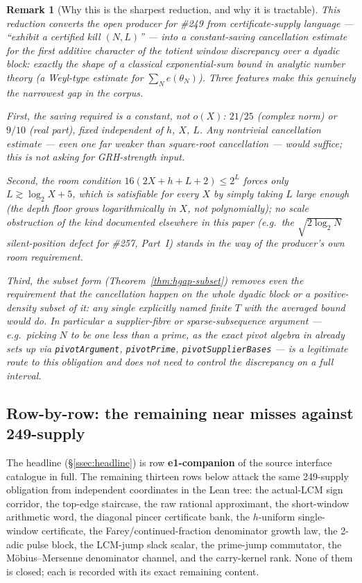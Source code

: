 \documentclass[11pt]{article}
\theoremstyle{breakplain}
\theoremstyle{breakdefinition}
\theoremstyle{breakdefinition}
\newtheorem{rem}[thm]{Remark}
\newcommand{\lean}[2]{\leanlink{#1}{#2}}
\begin{document}
\begin{rem}[Why this is the sharpest reduction, and why it is tractable]
This reduction converts the open producer for \#249 from certificate-supply language --- ``exhibit
a certified kill $(N,L)$'' --- into a \emph{constant-saving cancellation estimate for the first
additive character of the totient window discrepancy over a dyadic block}: exactly the shape of a
classical exponential-sum bound in analytic number theory (a Weyl-type estimate for
$\sum_N e(\theta_N)$). Three features make this genuinely the narrowest gap in the corpus.

First, the saving required is a \emph{constant}, not $o(X)$: $21/25$ (complex norm) or $9/10$
(real part), fixed independent of $h$, $X$, $L$. Any nontrivial cancellation estimate --- even one
far weaker than square-root cancellation --- would suffice; this is not asking for GRH-strength
input.

Second, the room condition $16(2X{+}h{+}L{+}2)\le 2^L$ forces only $L \gtrsim \log_2 X + 5$, which
is satisfiable for every $X$ by simply taking $L$ large enough (the depth floor grows logarithmically
in $X$, not polynomially); no scale obstruction of the kind documented elsewhere in this paper
(e.g.\ the $\sqrt{2\log_2 N}$ silent-position defect for \#257, Part~I) stands in the way of the
producer's own room requirement.

Third, the subset form (Theorem~\ref{thm:hgap-subset}) removes even the requirement that the
cancellation happen on the whole dyadic block or a positive-density subset of it: any single
explicitly named finite $T$ with the averaged bound would do. In particular a supplier-fibre or
sparse-subsequence argument --- e.g.\ picking $N$ to be one less than a prime, as the exact pivot
algebra in \lean{prime-pivot construction}{FirstHarmonicPivot.lean} already sets up via
\texttt{pivotArgument}, \texttt{pivotPrime}, \texttt{pivotSupplierBases} --- is a legitimate route
to this obligation and does not need to control the discrepancy on a full interval.
\end{rem}

\subsection{Row-by-row: the remaining near misses against 249-supply}

The headline (\S\ref{ssec:headline}) is row \textbf{e1-companion} of the source interface catalogue
in full. The remaining thirteen rows below attack the same 249-supply obligation from independent
coordinates in the Lean tree: the actual-LCM sign corridor, the top-edge staircase, the raw
rational approximant, the short-window arithmetic word, the diagonal pincer certificate bank, the
$h$-uniform single-window certificate, the Farey/continued-fraction denominator growth law, the
2-adic pulse block, the LCM-jump slack scalar, the prime-jump commutator, the M\"obius--Mersenne
denominator channel, and the carry-kernel rank. None of them is closed; each is recorded with its
exact remaining content.
\end{document}
